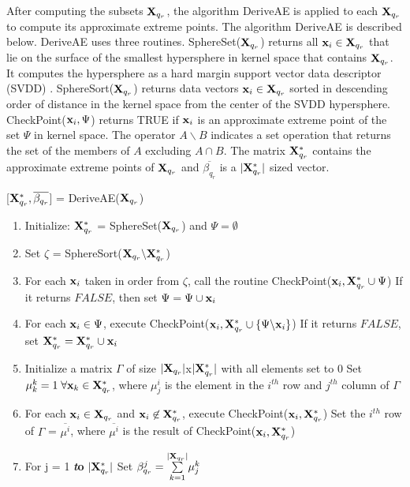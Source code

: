 \documentclass[twoside]{article}
\begin{document}
After computing the subsets ${\bf X}_{q_r}$, the algorithm DeriveAE is applied to each ${\bf X}_{q_r}$ to compute its approximate extreme points. The algorithm DeriveAE is described below. DeriveAE uses three routines. SphereSet(${\bf X}_{q_r}$) returns all ${\bf x}_i \in {\bf X}_{q_r}$ that lie on the surface of the smallest hypersphere in kernel space that contains ${\bf X}_{q_r}$. It computes the hypersphere as a hard margin support vector data descriptor (SVDD) \citep{Tax04}. SphereSort(${\bf X}_{q_r}$) returns data vectors ${\bf x}_i \in {\bf X}_{q_r}$ sorted in descending order of distance in the kernel space from the center of the SVDD hypersphere. CheckPoint(${\bf x}_i, \Psi$) returns TRUE if ${\bf x}_i$ is an approximate extreme point of the set $\Psi$ in kernel space. The operator $A \backslash B$ indicates a set operation that returns the set of the members of $A$ excluding $A \cap B$. The matrix ${\bf X}_{q_r}^*$ contains the approximate extreme points of ${\bf X}_{q_r}$ and $\overline{\beta_{q_r}}$ is a $|{\bf X}_{q_r}^*|$ sized vector.
\begin{algorithm}[h]
 \renewcommand{\thealgorithm}{}
\caption{[${\bf X}_{q_r}^*,\overline{\beta_{q_r}}$] = DeriveAE(${\bf X}_{q_r}$)}
\begin{enumerate} \addtolength{\itemsep}{-.35\baselineskip}
\item Initialize: ${\bf X}_{q_r}^*$ = SphereSet(${\bf X}_{q_r}$) and $\Psi = \emptyset$
\item Set $\zeta$ = SphereSort(${\bf X}_{q_r}\backslash {\bf X}_{q_r}^*$)
\item For each ${\bf x}_i$ taken in order from $\zeta$, call the routine CheckPoint(${\bf x}_i,{\bf X}_{q_r}^* \cup \Psi$)
\subitem If it returns $FALSE$, then set $\Psi = \Psi \cup {\bf x}_i$
\item For each ${\bf x}_i \in \Psi$, execute CheckPoint(${\bf x}_i,{\bf X}_{q_r}^* \cup \{\Psi \backslash {\bf x}_i\}$)
\subitem If it returns $FALSE$, set ${\bf X}_{q_r}^* = {\bf X}_{q_r}^* \cup {\bf x}_i$
\item Initialize a matrix $\Gamma$ of size $|{\bf X}_{q_r}|$x$|{\bf X}_{q_r}^*|$ with all elements set to 0
\subitem Set $\mu^k _k = 1 \;\forall {\bf x}_k \in {\bf X}_{q_r}^*$, where $\mu^i _j$ is the element in the $i^{th}$ row and $j^{th}$ column of $\Gamma$
\item For each ${\bf x}_i \in {\bf X}_{q_r}$ and ${\bf x}_i \not\in {\bf X}_{q_r}^*$, execute CheckPoint(${\bf x}_i,{\bf X}_{q_r}^*$)
\subitem Set the $i^{th}$ row of $\Gamma$ = $\overline{\mu ^i}$, where $\overline{\mu ^i}$ is the result of CheckPoint(${\bf x}_i,{\bf X}_{q_r}^*$)
\item For j = 1 {\bf{\emph to}} $|{\bf X}_{q_r}^*|$
\subitem Set $\beta_{q_r} ^ j = \overset{|{\bf X}_{q_r}|}{\underset{k = 1}{\sum}} \mu^k _j$
\end{enumerate}
\end{algorithm}
\end{document}
